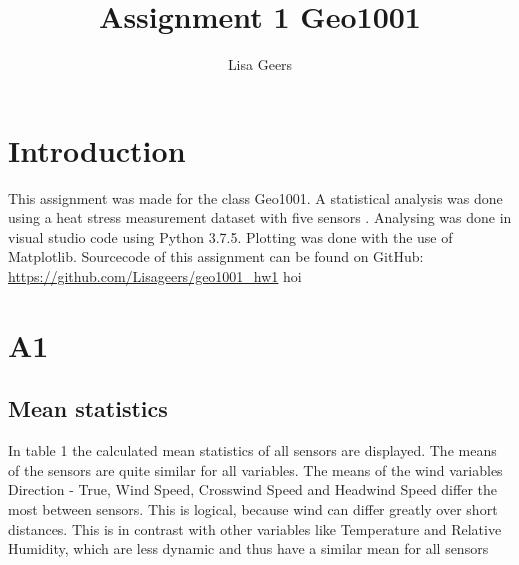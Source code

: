 \documentclass{article}
\title{Assignment 1 Geo1001}
\author{Lisa Geers}
\begin{document}
\maketitle

\section{Introduction}
    This assignment was made for the class Geo1001. A statistical analysis was done 
    using a heat stress measurement dataset with five sensors \cite{data} . Analysing was
    done in visual studio code using Python 3.7.5. Plotting was done with the use of Matplotlib.
    Sourcecode of this assignment can be found on GitHub: \url{https://github.com/Lisageers/geo1001_hw1}
    hoi
\section{A1}

    \subsection{Mean statistics}

        In table 1 the calculated mean statistics of all sensors are displayed. The means of the sensors are
        quite similar for all variables. The means of the wind variables Direction - True, Wind Speed, 
        Crosswind Speed and Headwind Speed differ the most between sensors. This is logical, because 
        wind can differ greatly over short distances. This is in contrast with other variables 
        like Temperature and Relative Humidity, which are less dynamic and thus have a similar mean for all 
        sensors
\end{document}

